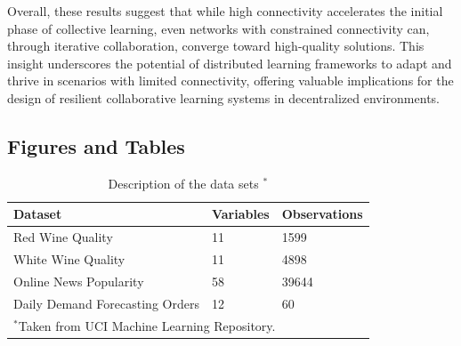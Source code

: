 \documentclass[conference]{IEEEtran}
\begin{document}
Overall, these results suggest that while high connectivity accelerates the initial phase of collective learning, even networks with constrained connectivity can, through iterative collaboration, converge toward high-quality solutions. This insight underscores the potential of distributed learning frameworks to adapt and thrive in scenarios with limited connectivity, offering valuable implications for the design of resilient collaborative learning systems in decentralized environments.

\subsection{Figures and Tables}

\begin{table}[htbp]
\caption{Description of the data sets $^{\mathrm{*}}$}
\begin{center}
\begin{tabular}{|l|l|l|}
\hline
\textbf{Dataset} & \textbf{Variables} & \textbf{Observations} \\
\hline
Red Wine Quality & 11 & 1599 \\
\hline
White Wine Quality & 11 & 4898 \\
\hline
Online News Popularity & 58 & 39644 \\
\hline
Daily Demand Forecasting Orders & 12 & 60 \\
\hline
\multicolumn{3}{l}{$^{\mathrm{*}}$Taken from UCI Machine Learning Repository.}
\end{tabular}
\label{tab1}
\end{center}
\end{table}
\end{document}
